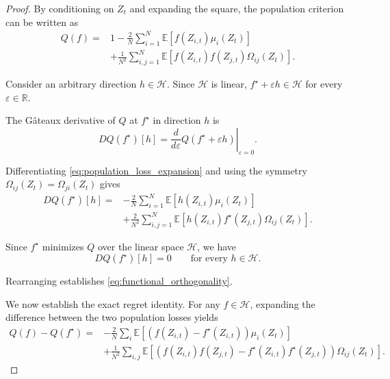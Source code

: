 \begin{proof}

By conditioning on $Z_t$ and expanding the square,
the population criterion can be written as
\begin{equation}
\begin{aligned}
Q(f)
={}&1
-\frac{2}{N}
\sum_{i=1}^{N}
\mathbb E\left[
f(Z_{i,t})\mu_i(Z_t)
\right]\\
&+
\frac{1}{N^2}
\sum_{i,j=1}^{N}
\mathbb E\left[
f(Z_{i,t})f(Z_{j,t})
\Omega_{ij}(Z_t)
\right].
\end{aligned}
\label{eq:population_loss_expansion}
\end{equation}

Consider an arbitrary direction $h\in\mathcal H$.
Since $\mathcal H$ is linear,
$f^\star+\varepsilon h\in\mathcal H$ for every
$\varepsilon\in\mathbb R$.

The Gâteaux derivative of $Q$ at $f^\star$
in direction $h$ is
\[
DQ(f^\star)[h]
=
\left.
\frac{d}{d\varepsilon}
Q(f^\star+\varepsilon h)
\right|_{\varepsilon=0}.
\]

Differentiating \eqref{eq:population_loss_expansion}
and using the symmetry
$\Omega_{ij}(Z_t)=\Omega_{ji}(Z_t)$ gives
\[
\begin{aligned}
DQ(f^\star)[h]
={}&
-\frac{2}{N}
\sum_{i=1}^{N}
\mathbb E[
h(Z_{i,t})\mu_i(Z_t)
]\\
&+
\frac{2}{N^2}
\sum_{i,j=1}^{N}
\mathbb E[
h(Z_{i,t})f^\star(Z_{j,t})
\Omega_{ij}(Z_t)
].
\end{aligned}
\]

Since $f^\star$ minimizes $Q$ over the linear space
$\mathcal H$, we have
\[
DQ(f^\star)[h]=0
\qquad
\text{for every }h\in\mathcal H.
\]

Rearranging establishes
\eqref{eq:functional_orthogonality}.

We now establish the exact regret identity.
For any $f\in\mathcal H$, expanding the difference
between the two population losses yields
\[
\begin{aligned}
Q(f)-Q(f^\star)
={}&
-\frac{2}{N}
\sum_i
\mathbb E[
(f(Z_{i,t})-f^\star(Z_{i,t}))
\mu_i(Z_t)
]\\
&+
\frac{1}{N^2}
\sum_{i,j}
\mathbb E[
(f(Z_{i,t})f(Z_{j,t})
-f^\star(Z_{i,t})f^\star(Z_{j,t}))
\Omega_{ij}(Z_t)
].
\end{aligned}
\]


\end{proof}
